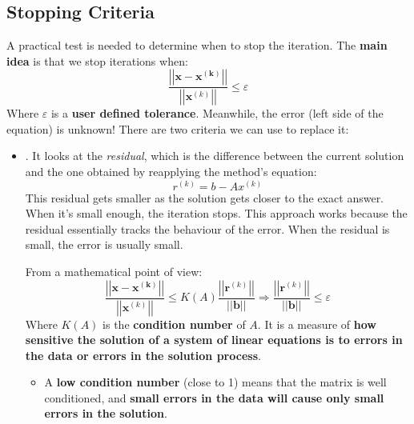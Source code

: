 \subsection{Stopping Criteria}

A practical test is needed to determine when to stop the iteration. The \textbf{main idea} is that we stop iterations when:
\begin{equation*}
    \dfrac{\left|\left|\mathbf{x} - \mathbf{x^{\left(k\right)}}\right|\right|}{\left|\left|\mathbf{x}^{\left(k\right)}\right|\right|} \le \varepsilon
\end{equation*}
Where $\varepsilon$ is a \textbf{user defined tolerance}. Meanwhile, the error (left side of the equation) is unknown! There are two criteria we can use to replace it:
\begin{itemize}
    \item {}. It looks at the \emph{residual}, which is the difference between the current solution and the one obtained by reapplying the method's equation:
    \begin{equation*}
        r^{\left(k\right)} = b - Ax^{\left(k\right)}
    \end{equation*}
    This residual gets smaller as the solution gets closer to the exact answer. When it's small enough, the iteration stops. This approach works because the residual essentially tracks the behaviour of the error. When the residual is small, the error is usually small.
    
    From a mathematical point of view:
    \begin{equation*}
        \dfrac{\left|\left|\mathbf{x} - \mathbf{x^{\left(k\right)}}\right|\right|}{\left|\left|\mathbf{x}^{\left(k\right)}\right|\right|} \le K\left(A\right) \dfrac{\left|\left|\mathbf{r}^{\left(k\right)}\right|\right|}{\left|\left|\mathbf{b}\right|\right|} \Longrightarrow \dfrac{\left|\left|\mathbf{r}^{\left(k\right)}\right|\right|}{\left|\left|\mathbf{b}\right|\right|} \le \varepsilon
    \end{equation*}
    Where $K\left(A\right)$ is the \textbf{condition number} of $A$. It is a measure of \textbf{how sensitive the solution of a system of linear equations is to errors in the data or errors in the solution process}.
    \begin{itemize}
        \item A \textbf{low condition number} (close to 1) means that the matrix is well conditioned, and \textbf{small errors in the data will cause only small errors in the solution}.


\end{itemize}
\end{itemize}
